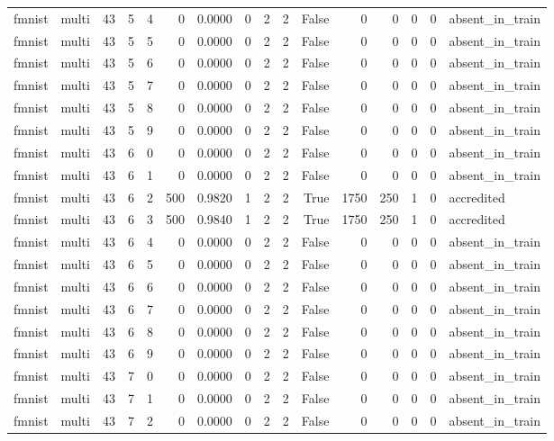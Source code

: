 \begin{tabular}{llrrrrrrrrrrrrrl}
fmnist & multi & 43 & 5 & 4 & 0 & 0.0000 & 0 & 2 & 2 & False & 0 & 0 & 0 & 0 & absent\_in\_train \\
fmnist & multi & 43 & 5 & 5 & 0 & 0.0000 & 0 & 2 & 2 & False & 0 & 0 & 0 & 0 & absent\_in\_train \\
fmnist & multi & 43 & 5 & 6 & 0 & 0.0000 & 0 & 2 & 2 & False & 0 & 0 & 0 & 0 & absent\_in\_train \\
fmnist & multi & 43 & 5 & 7 & 0 & 0.0000 & 0 & 2 & 2 & False & 0 & 0 & 0 & 0 & absent\_in\_train \\
fmnist & multi & 43 & 5 & 8 & 0 & 0.0000 & 0 & 2 & 2 & False & 0 & 0 & 0 & 0 & absent\_in\_train \\
fmnist & multi & 43 & 5 & 9 & 0 & 0.0000 & 0 & 2 & 2 & False & 0 & 0 & 0 & 0 & absent\_in\_train \\
fmnist & multi & 43 & 6 & 0 & 0 & 0.0000 & 0 & 2 & 2 & False & 0 & 0 & 0 & 0 & absent\_in\_train \\
fmnist & multi & 43 & 6 & 1 & 0 & 0.0000 & 0 & 2 & 2 & False & 0 & 0 & 0 & 0 & absent\_in\_train \\
fmnist & multi & 43 & 6 & 2 & 500 & 0.9820 & 1 & 2 & 2 & True & 1750 & 250 & 1 & 0 & accredited \\
fmnist & multi & 43 & 6 & 3 & 500 & 0.9840 & 1 & 2 & 2 & True & 1750 & 250 & 1 & 0 & accredited \\
fmnist & multi & 43 & 6 & 4 & 0 & 0.0000 & 0 & 2 & 2 & False & 0 & 0 & 0 & 0 & absent\_in\_train \\
fmnist & multi & 43 & 6 & 5 & 0 & 0.0000 & 0 & 2 & 2 & False & 0 & 0 & 0 & 0 & absent\_in\_train \\
fmnist & multi & 43 & 6 & 6 & 0 & 0.0000 & 0 & 2 & 2 & False & 0 & 0 & 0 & 0 & absent\_in\_train \\
fmnist & multi & 43 & 6 & 7 & 0 & 0.0000 & 0 & 2 & 2 & False & 0 & 0 & 0 & 0 & absent\_in\_train \\
fmnist & multi & 43 & 6 & 8 & 0 & 0.0000 & 0 & 2 & 2 & False & 0 & 0 & 0 & 0 & absent\_in\_train \\
fmnist & multi & 43 & 6 & 9 & 0 & 0.0000 & 0 & 2 & 2 & False & 0 & 0 & 0 & 0 & absent\_in\_train \\
fmnist & multi & 43 & 7 & 0 & 0 & 0.0000 & 0 & 2 & 2 & False & 0 & 0 & 0 & 0 & absent\_in\_train \\
fmnist & multi & 43 & 7 & 1 & 0 & 0.0000 & 0 & 2 & 2 & False & 0 & 0 & 0 & 0 & absent\_in\_train \\
fmnist & multi & 43 & 7 & 2 & 0 & 0.0000 & 0 & 2 & 2 & False & 0 & 0 & 0 & 0 & absent\_in\_train \\

\end{tabular}
